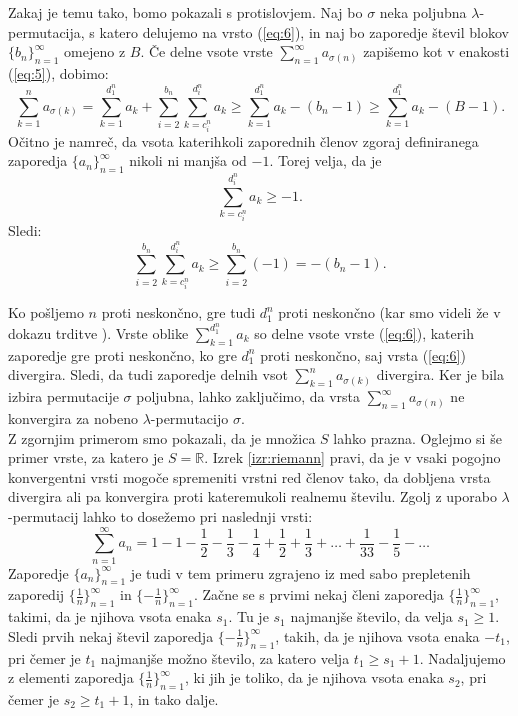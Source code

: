 \documentclass[12pt,a4paper,reqno]{amsart}
\theoremstyle{definition} %
\theoremstyle{plain} %
\newcommand{\R}{\mathbb R}
\begin{document}
Zakaj je temu tako, bomo pokazali s protislovjem. Naj bo $\sigma$ neka poljubna $\lambda$-permutacija, s katero delujemo na vrsto (\ref{eq:6}), in naj bo zaporedje števil blokov $\{b_n\}_{n=1}^{\infty}$ omejeno z $B$. Če delne vsote vrste $\sum_{n=1}^{\infty}a_{\sigma(n)}$ zapišemo kot v enakosti (\ref{eq:5}), dobimo:
$$\sum_{k=1}^{n}a_{\sigma(k)}=\sum_{k=1}^{d_1^n}a_{k} + \sum_{i=2}^{b_n}\sum_{k=c_i^n}^{d_i^n}a_{k} \geq \sum_{k=1}^{d_1^n}a_{k} - (b_n -1) \geq \sum_{k=1}^{d_1^n}a_{k} - (B -1).$$
Očitno je namreč, da vsota katerihkoli zaporednih členov zgoraj definiranega zaporedja $\{a_n\}_{n=1}^{\infty}$ nikoli ni manjša od $-1$. Torej velja, da je $$\sum_{k=c_i^n}^{d_i^n}a_{k} \geq -1.$$ Sledi:
$$\sum_{i=2}^{b_n}\sum_{k=c_i^n}^{d_i^n}a_{k} \geq \sum_{i=2}^{b_n}(-1) = -(b_n-1).$$

Ko pošljemo $n$ proti neskončno, gre tudi $d_1^n$ proti neskončno (kar smo videli že v dokazu trditve \label{trd:ohranjanje}). Vrste oblike $\sum_{k=1}^{d_1^n}a_{k}$ so delne vsote vrste (\ref{eq:6}), katerih zaporedje gre proti neskončno, ko gre $d_1^n$ proti neskončno, saj vrsta (\ref{eq:6}) divergira. Sledi, da tudi zaporedje delnih vsot $\sum_{k=1}^{n}a_{\sigma(k)}$ divergira. Ker je bila izbira permutacije $\sigma$ poljubna, lahko zaključimo, da vrsta $\sum_{n=1}^{\infty}a_{\sigma(n)}$ ne konvergira za nobeno $\lambda$-permutacijo $\sigma$.\\


Z zgornjim primerom smo pokazali, da je množica $S$ lahko prazna. Oglejmo si še primer vrste, za katero je $S=\R$. Izrek \ref{izr:riemann} pravi, da je v vsaki pogojno konvergentni vrsti mogoče spremeniti vrstni red členov tako, da dobljena vrsta divergira ali pa konvergira proti kateremukoli realnemu številu. Zgolj z uporabo $\lambda$-permutacij lahko to dosežemo pri naslednji vrsti:
\begin{equation}\label{eq:7}
\sum^{\infty}_{n=1}a_n= 1-1-\frac{1}{2}-\frac{1}{3}-\frac{1}{4}+\frac{1}{2}+\frac{1}{3}+\dots +\frac{1}{33}-\frac{1}{5}-\dots
\end{equation}
Zaporedje $\{a_n\}_{n=1}^{\infty}$ je tudi v tem primeru zgrajeno iz med sabo prepletenih zaporedij $\{\frac{1}{n}\}_{n=1}^{\infty}$ in $\{-\frac{1}{n}\}_{n=1}^{\infty}$. Začne se s prvimi nekaj členi zaporedja $\{\frac{1}{n}\}_{n=1}^{\infty}$, takimi, da je njihova vsota enaka $s_1$. Tu je $s_1$ najmanjše število, da velja $s_1 \geq 1$. Sledi prvih nekaj števil zaporedja $\{-\frac{1}{n}\}_{n=1}^{\infty}$, takih, da je njihova vsota enaka $-t_1$, pri čemer je $t_1$ najmanjše možno število, za katero velja $t_1 \geq s_1+1$. Nadaljujemo z elementi zaporedja $\{\frac{1}{n}\}_{n=1}^{\infty}$, ki jih je toliko, da je njihova vsota enaka $s_2$, pri čemer je $s_2\geq t_1+1$, in tako dalje. %
\end{document}
